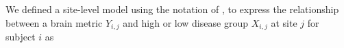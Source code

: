 We defined a site-level model using the notation of \cite{Raudenbush2000}, to express the relationship between a brain metric $Y_{i,j}$ and high or low disease group $X_{i,j}$ at site $j$ for subject $i$ as %